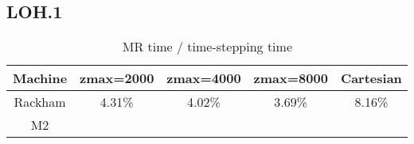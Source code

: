 \subsection{LOH.1}
\begin{table}[htbp]
	\begin{center}
		\begin{tabular}{|c|c c c|c|}
			\hline
			Machine   & zmax=2000& zmax=4000 & zmax=8000 & Cartesian \\
			\hline
			Rackham & 4.31\% &  4.02\%& 3.69\%  & 8.16\%\\
			\hline
			M2 & &  & &\\
			\hline 
		\end{tabular}
	\end{center}
		\caption{MR time / time-stepping time}
\end{table} 
